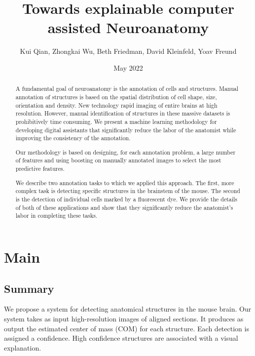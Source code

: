 \documentclass[runningheads]{llncs}
\title{Towards explainable computer assisted Neuroanatomy}
\author{Kui Qian, Zhongkai Wu, Beth Friedman, David Kleinfeld, Yoav Freund}
\date{May 2022}
\begin{document}
\maketitle

\begin{abstract}
  A fundamental goal of neuroanatomy is the annotation of cells and
  structures.  Manual annotation of structures is based on the spatial
  distribution of cell shape, size, orientation and density.  New
  technology rapid imaging of entire brains at high resolution.
  However, manual identification of structures in these massive
  datasets is prohibitively time consuming.  We present a machine
  learning methodology for developing digital assistants that
  significantly reduce the labor of the anatomist while improving the
  consistency of the annotation.

  Our methodology is based on designing, for each annotation problem,
  a large number of features and using boosting on manually annotated
  images to select the most predictive features.

  We describe two annotation tasks to which we applied this approach.
  The first, more complex task is detecting specific structures in the
  brainstem of the mouse. The second is the detection of individual cells marked
  by a fluorescent dye. We provide the details of both of these
  applications and show that they significantly reduce the anatomist's
  labor in completing these tasks.
  
\end{abstract}

\section{Main}
\subsection{Summary}
We propose a system for detecting anatomical structures in the mouse
brain. Our system takes as input high-resolution images of aligned
sections. It produces as output the estimated center of mass (COM) for
each structure. Each detection is assigned a confidence. High
confidence structures are associated with a visual explanation.
\end{document}
